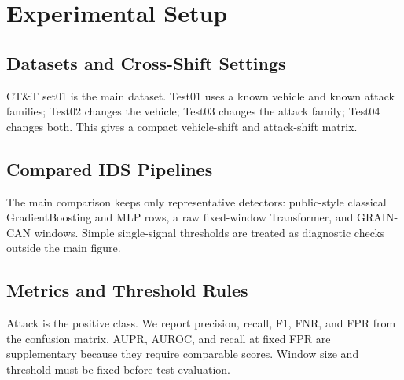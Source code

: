 \documentclass[runningheads]{llncs}
\begin{document}
\section{Experimental Setup}
\subsection{Datasets and Cross-Shift Settings}
CT\&T set01 is the main dataset. Test01 uses a known vehicle and known attack families; Test02 changes the vehicle; Test03 changes the attack family; Test04 changes both. This gives a compact vehicle-shift and attack-shift matrix.
\begin{table}[H]
\caption{CT\&T cross-shift settings used in the main evaluation.}\label{tab:settings}
\centering\small
{}
\end{table}

\subsection{Compared IDS Pipelines}
The main comparison keeps only representative detectors: public-style classical GradientBoosting and MLP rows, a raw fixed-window Transformer, and GRAIN-CAN windows. Simple single-signal thresholds are treated as diagnostic checks outside the main figure.

\subsection{Metrics and Threshold Rules}
Attack is the positive class. We report precision, recall, F1, FNR, and FPR from the confusion matrix. AUPR, AUROC, and recall at fixed FPR are supplementary because they require comparable scores. Window size and threshold must be fixed before test evaluation.
\end{document}

